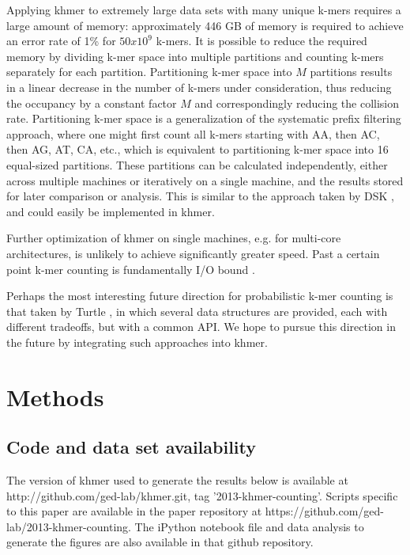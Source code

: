 \documentclass{article}
\begin{document}
Applying khmer to extremely large data sets with many unique k-mers
requires a large amount of memory: approximately 446 GB of memory is
required to achieve an error rate of 1\% for
$50x10^9$ k-mers. It is possible to reduce the required memory by dividing
k-mer space into multiple partitions and counting k-mers separately
for each partition. Partitioning k-mer space into $M$ partitions
results in a linear decrease in the number of k-mers under
consideration, thus reducing the occupancy by a constant factor $M$
and correspondingly reducing the collision rate.  Partitioning k-mer
space is a generalization of the systematic prefix filtering approach,
where one might first count all k-mers starting with AA, then AC, then
AG, AT, CA, etc., which is equivalent to partitioning k-mer space into
16 equal-sized partitions. These partitions can be calculated
independently, either across multiple machines or iteratively on a
single machine, and the results stored for later comparison or
analysis.  This is similar to the approach taken by DSK
\cite{Rizk2013}, and could easily be implemented in khmer.

Further optimization of khmer on single machines, e.g. for multi-core
architectures, is unlikely to achieve significantly greater speed.
Past a certain point k-mer counting is fundamentally I/O bound
\cite{McDonald2013}.

Perhaps the most interesting future direction for probabilistic k-mer
counting is that taken by Turtle \cite{Roy2013}, in which several
data structures are provided, each with different tradeoffs, but with
a common API.  We hope to pursue this direction in the future by
integrating such approaches into khmer.

\section{Methods}

\subsection{Code and data set availability}


The version of khmer used to generate the results below is available
at http://github.com/ged-lab/khmer.git, tag '2013-khmer-counting'.
Scripts specific to this paper are available in the paper repository
at https://github.com/ged-lab/2013-khmer-counting.
The iPython\cite{4160251} notebook file and data analysis to generate the figures are also
available in that github repository. 
\end{document}
